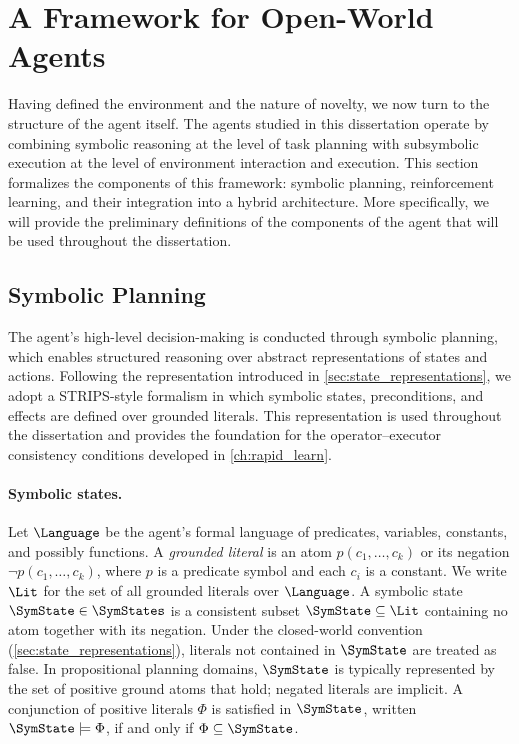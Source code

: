 \section{A Framework for Open-World Agents}
\label{sec:agent_framework}

Having defined the environment and the nature of novelty, we now turn to the structure of the agent itself. The agents studied in this dissertation operate by combining symbolic reasoning at the level of task planning with subsymbolic execution at the level of environment interaction and execution. 
This section formalizes the components of this framework: symbolic planning, reinforcement learning, and their integration into a hybrid architecture. More specifically, we will provide the preliminary definitions of the components of the agent that will be used throughout the dissertation.

\subsection{Symbolic Planning}
\label{sec:symbolic_planning}

The agent's high-level decision-making is conducted through symbolic planning, which enables structured reasoning over abstract representations of states and actions. Following the representation introduced in \cref{sec:state_representations}, we adopt a STRIPS-style formalism \citep{fikes1971strips} in which symbolic states, preconditions, and effects are defined over grounded literals. This representation is used throughout the dissertation and provides the foundation for the operator--executor consistency conditions developed in \cref{ch:rapid_learn}.

\paragraph{Symbolic states.}
Let $\Language$ be the agent's formal language of predicates, variables, constants, and possibly functions. A \emph{grounded literal} is an atom $p(c_1, \ldots, c_k)$ or its negation $\neg p(c_1, \ldots, c_k)$, where $p$ is a predicate symbol and each $c_i$ is a constant. We write $\Lit$ for the set of all grounded literals over $\Language$. A symbolic state $\SymState \in \SymStates$ is a consistent subset $\SymState \subseteq \Lit$ containing no atom together with its negation. Under the closed-world convention (\cref{sec:state_representations}), literals not contained in $\SymState$ are treated as false. In propositional planning domains, $\SymState$ is typically represented by the set of positive ground atoms that hold; negated literals are implicit. A conjunction of positive literals $\Phi$ is satisfied in $\SymState$, written $\SymState \models \Phi$, if and only if $\Phi \subseteq \SymState$.

